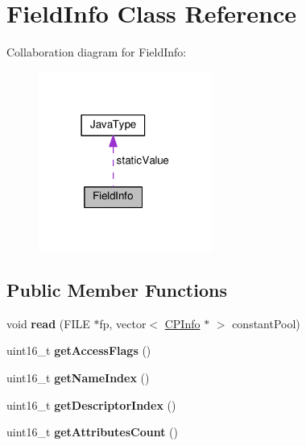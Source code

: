 \hypertarget{classFieldInfo}{}\section{Field\+Info Class Reference}
\label{classFieldInfo}


Collaboration diagram for Field\+Info\+:\nopagebreak
\begin{figure}[H]
\begin{center}
\leavevmode
\includegraphics[width=162pt]{classFieldInfo__coll__graph}
\end{center}
\end{figure}
\subsection*{Public Member Functions}
\begin{DoxyCompactItemize}
\item 
void {\bfseries read} (F\+I\+LE $\ast$fp, vector$<$ \hyperlink{classCPInfo}{C\+P\+Info} $\ast$ $>$ constant\+Pool)\hypertarget{classFieldInfo_ac28def66447b6ba142a7d1036b13f78f}{}\label{classFieldInfo_ac28def66447b6ba142a7d1036b13f78f}

\item 
uint16\+\_\+t {\bfseries get\+Access\+Flags} ()\hypertarget{classFieldInfo_a8f6bd79873bbf80215831234c16d03c0}{}\label{classFieldInfo_a8f6bd79873bbf80215831234c16d03c0}

\item 
uint16\+\_\+t {\bfseries get\+Name\+Index} ()\hypertarget{classFieldInfo_af0f0b36991366dabb9899799891c98e1}{}\label{classFieldInfo_af0f0b36991366dabb9899799891c98e1}

\item 
uint16\+\_\+t {\bfseries get\+Descriptor\+Index} ()\hypertarget{classFieldInfo_a48dba1ad239aa8577fbbb9b93db9d127}{}\label{classFieldInfo_a48dba1ad239aa8577fbbb9b93db9d127}

\item 
uint16\+\_\+t {\bfseries get\+Attributes\+Count} ()\hypertarget{classFieldInfo_a7a13cc4838d95f9564d7e32b8af3c452}{}\label{classFieldInfo_a7a13cc4838d95f9564d7e32b8af3c452}

\end{DoxyCompactItemize}
